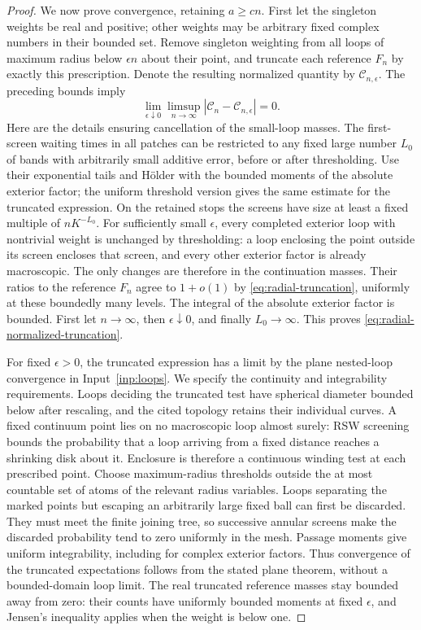 \begin{proof}
We now prove convergence, retaining $a\ge cn$. First let the
singleton weights be real and positive; other weights may be
arbitrary fixed complex numbers in their bounded set. Remove
singleton weighting from all loops of maximum radius below
$\epsilon n$ about their point, and truncate each reference $F_n$
by exactly this prescription. Denote the resulting normalized
quantity by $\mathcal C_{n,\epsilon}$. The preceding bounds imply
\begin{equation}\label{eq:radial-normalized-truncation}
 \lim_{\epsilon\downarrow0}\limsup_{n\to\infty}
 |\mathcal C_n-\mathcal C_{n,\epsilon}|=0.
\end{equation}
Here are the details ensuring cancellation of the small-loop masses.
The first-screen waiting times in all patches can be restricted to
any fixed large number $L_0$ of bands with arbitrarily small additive
error, before or after thresholding. Use their exponential tails
and H\"older with the bounded moments of the absolute exterior
factor; the uniform threshold version gives the same estimate for
the truncated expression. On the retained stops the screens have
size at least a fixed multiple of $nK^{-L_0}$. For sufficiently
small $\epsilon$, every completed exterior loop with nontrivial
weight is unchanged by thresholding: a loop enclosing the point
outside its screen encloses that screen, and every other exterior
factor is already macroscopic. The only changes are therefore in
the continuation masses. Their ratios to the reference $F_n$ agree
to $1+o(1)$ by \eqref{eq:radial-truncation}, uniformly at these
boundedly many levels. The integral of the absolute exterior factor
is bounded. First let $n\to\infty$, then $\epsilon\downarrow0$,
and finally $L_0\to\infty$. This proves
\eqref{eq:radial-normalized-truncation}.

For fixed $\epsilon>0$, the truncated expression has a limit by
the plane nested-loop convergence in Input~\ref{inp:loops}. We
specify the continuity and integrability requirements. Loops deciding
the truncated test have spherical diameter bounded below after
rescaling, and the cited topology retains their individual curves.
A fixed continuum point lies on no macroscopic loop almost surely:
RSW screening bounds the probability that a loop arriving from a
fixed distance reaches a shrinking disk about it. Enclosure is
therefore a continuous winding test at each prescribed point.
Choose maximum-radius thresholds outside the at most countable
set of atoms of the relevant radius variables. Loops separating
the marked points but escaping an arbitrarily large fixed ball
can first be discarded. They must meet the finite joining tree,
so successive annular screens make the discarded probability tend
to zero uniformly in the mesh. Passage moments give uniform
integrability, including for complex exterior factors. Thus
convergence of the truncated expectations follows from the stated
plane theorem, without a bounded-domain loop limit. The real
truncated reference masses stay bounded away from zero: their
counts have uniformly bounded moments at fixed $\epsilon$, and
Jensen's inequality applies when the weight is below one.


\end{proof}
